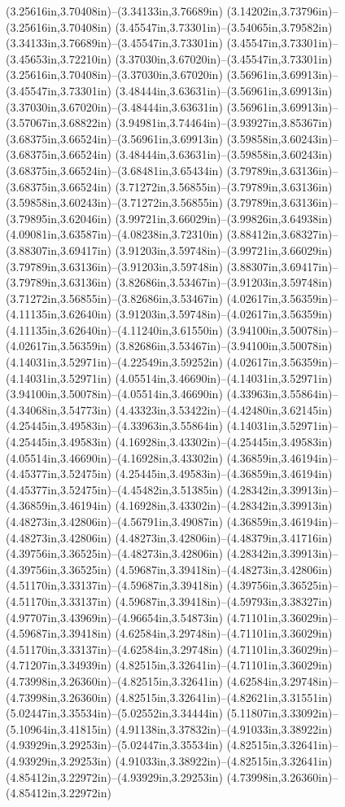 (3.25616in,3.70408in)--(3.34133in,3.76689in) (3.14202in,3.73796in)--(3.25616in,3.70408in) (3.45547in,3.73301in)--(3.54065in,3.79582in) (3.34133in,3.76689in)--(3.45547in,3.73301in) (3.45547in,3.73301in)--(3.45653in,3.72210in) (3.37030in,3.67020in)--(3.45547in,3.73301in) (3.25616in,3.70408in)--(3.37030in,3.67020in) (3.56961in,3.69913in)--(3.45547in,3.73301in) (3.48444in,3.63631in)--(3.56961in,3.69913in) (3.37030in,3.67020in)--(3.48444in,3.63631in) (3.56961in,3.69913in)--(3.57067in,3.68822in) (3.94981in,3.74464in)--(3.93927in,3.85367in) (3.68375in,3.66524in)--(3.56961in,3.69913in) (3.59858in,3.60243in)--(3.68375in,3.66524in) (3.48444in,3.63631in)--(3.59858in,3.60243in) (3.68375in,3.66524in)--(3.68481in,3.65434in) (3.79789in,3.63136in)--(3.68375in,3.66524in) (3.71272in,3.56855in)--(3.79789in,3.63136in) (3.59858in,3.60243in)--(3.71272in,3.56855in) (3.79789in,3.63136in)--(3.79895in,3.62046in) (3.99721in,3.66029in)--(3.99826in,3.64938in) (4.09081in,3.63587in)--(4.08238in,3.72310in) (3.88412in,3.68327in)--(3.88307in,3.69417in) (3.91203in,3.59748in)--(3.99721in,3.66029in) (3.79789in,3.63136in)--(3.91203in,3.59748in) (3.88307in,3.69417in)--(3.79789in,3.63136in) (3.82686in,3.53467in)--(3.91203in,3.59748in) (3.71272in,3.56855in)--(3.82686in,3.53467in) (4.02617in,3.56359in)--(4.11135in,3.62640in) (3.91203in,3.59748in)--(4.02617in,3.56359in) (4.11135in,3.62640in)--(4.11240in,3.61550in) (3.94100in,3.50078in)--(4.02617in,3.56359in) (3.82686in,3.53467in)--(3.94100in,3.50078in) (4.14031in,3.52971in)--(4.22549in,3.59252in) (4.02617in,3.56359in)--(4.14031in,3.52971in) (4.05514in,3.46690in)--(4.14031in,3.52971in) (3.94100in,3.50078in)--(4.05514in,3.46690in) (4.33963in,3.55864in)--(4.34068in,3.54773in) (4.43323in,3.53422in)--(4.42480in,3.62145in) (4.25445in,3.49583in)--(4.33963in,3.55864in) (4.14031in,3.52971in)--(4.25445in,3.49583in) (4.16928in,3.43302in)--(4.25445in,3.49583in) (4.05514in,3.46690in)--(4.16928in,3.43302in) (4.36859in,3.46194in)--(4.45377in,3.52475in) (4.25445in,3.49583in)--(4.36859in,3.46194in) (4.45377in,3.52475in)--(4.45482in,3.51385in) (4.28342in,3.39913in)--(4.36859in,3.46194in) (4.16928in,3.43302in)--(4.28342in,3.39913in) (4.48273in,3.42806in)--(4.56791in,3.49087in) (4.36859in,3.46194in)--(4.48273in,3.42806in) (4.48273in,3.42806in)--(4.48379in,3.41716in) (4.39756in,3.36525in)--(4.48273in,3.42806in) (4.28342in,3.39913in)--(4.39756in,3.36525in) (4.59687in,3.39418in)--(4.48273in,3.42806in) (4.51170in,3.33137in)--(4.59687in,3.39418in) (4.39756in,3.36525in)--(4.51170in,3.33137in) (4.59687in,3.39418in)--(4.59793in,3.38327in) (4.97707in,3.43969in)--(4.96654in,3.54873in) (4.71101in,3.36029in)--(4.59687in,3.39418in) (4.62584in,3.29748in)--(4.71101in,3.36029in) (4.51170in,3.33137in)--(4.62584in,3.29748in) (4.71101in,3.36029in)--(4.71207in,3.34939in) (4.82515in,3.32641in)--(4.71101in,3.36029in) (4.73998in,3.26360in)--(4.82515in,3.32641in) (4.62584in,3.29748in)--(4.73998in,3.26360in) (4.82515in,3.32641in)--(4.82621in,3.31551in) (5.02447in,3.35534in)--(5.02552in,3.34444in) (5.11807in,3.33092in)--(5.10964in,3.41815in) (4.91138in,3.37832in)--(4.91033in,3.38922in) (4.93929in,3.29253in)--(5.02447in,3.35534in) (4.82515in,3.32641in)--(4.93929in,3.29253in) (4.91033in,3.38922in)--(4.82515in,3.32641in) (4.85412in,3.22972in)--(4.93929in,3.29253in) (4.73998in,3.26360in)--(4.85412in,3.22972in) 